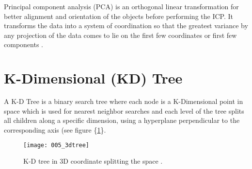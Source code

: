 \documentclass[../structure.tex]{subfiles}
\begin{document}
Principal component analysis (PCA) is an orthogonal linear transformation for better alignment and orientation of the objects before performing the ICP.  It transforms the data into a system of coordination so that the greatest variance by any projection of the data comes to lie on the first few coordinates or first few components \cite{Jolliffe2002}.


\section{K-Dimensional (KD) Tree}

A K-D Tree is a binary search tree where each node is a K-Dimensional point in space which is used for nearest neighbor searches and each level of the tree splits all children along a specific dimension, using a hyperplane perpendicular to the corresponding axis (see figure \{\ref{fig:k_d_tree}\}.

\begin{figure}[h!]
	\centering
	\texttt{[image: 005\_3dtree]}
	\captionsetup{justification=centering}
	\caption{K-D tree in 3D coordinate splitting the space \cite{Wikipedia2006}.}
	\label{fig:k_d_tree}
\end{figure}
\end{document}
